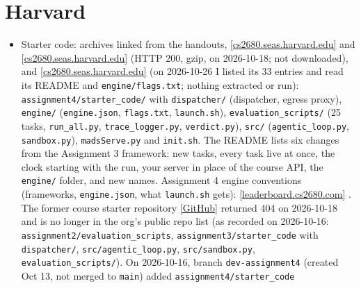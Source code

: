 \documentclass[10pt,oneside]{report}
\begin{document}
\section{Harvard}
{\small\begin{itemize}
\item Starter code: archives linked from the handouts, \href{https://cs2680.seas.harvard.edu/assignments/assignment2.tar.gz}{[cs2680.seas.harvard.edu]} and \href{https://cs2680.seas.harvard.edu/assignments/assignment3.tar.gz}{[cs2680.seas.harvard.edu]} (HTTP 200, gzip, on 2026-10-18; not downloaded), and \href{https://cs2680.seas.harvard.edu/assignments/assignment4.tar.gz}{[cs2680.seas.harvard.edu]} (on 2026-10-26 I listed its 33 entries and read its README and \texttt{engine/\allowbreak{}flags.\allowbreak{}txt}; nothing extracted or run): \texttt{assignment4/\allowbreak{}starter\_\allowbreak{}code/\allowbreak{}} with \texttt{dispatcher/\allowbreak{}} (dispatcher, egress proxy), \texttt{engine/\allowbreak{}} (\texttt{engine.\allowbreak{}json}, \texttt{flags.\allowbreak{}txt}, \texttt{launch.\allowbreak{}sh}), \texttt{evaluation\_\allowbreak{}scripts/\allowbreak{}} (25 tasks, \texttt{run\_\allowbreak{}all.\allowbreak{}py}, \texttt{trace\_\allowbreak{}logger.\allowbreak{}py}, \texttt{verdict.\allowbreak{}py}), \texttt{src/\allowbreak{}} (\texttt{agentic\_\allowbreak{}loop.\allowbreak{}py}, \texttt{sandbox.\allowbreak{}py}), \texttt{madsServe.\allowbreak{}py} and \texttt{init.\allowbreak{}sh}. The README lists six changes from the Assignment 3 framework: new tasks, every task live at once, the clock starting with the run, your server in place of the course API, the \texttt{engine/\allowbreak{}} folder, and new names. Assignment 4 engine conventions (frameworks, \texttt{engine.\allowbreak{}json}, what \texttt{launch.\allowbreak{}sh} gets): \href{https://leaderboard.cs2680.com/a4/engines.html}{[leaderboard.cs2680.com]} . The former course starter repository \href{https://github.com/HarvardMadSys/cs2680_assignments}{[GitHub]} returned 404 on 2026-10-18 and is no longer in the org's public repo list (as recorded on 2026-10-16: \texttt{assignment2/\allowbreak{}evaluation\_\allowbreak{}scripts}, \texttt{assignment3/\allowbreak{}starter\_\allowbreak{}code} with \texttt{dispatcher/\allowbreak{}}, \texttt{src/\allowbreak{}agentic\_\allowbreak{}loop.\allowbreak{}py}, \texttt{src/\allowbreak{}sandbox.\allowbreak{}py}, \texttt{evaluation\_\allowbreak{}scripts/\allowbreak{}}). On 2026-10-16, branch \texttt{dev-assignment4} (created Oct 13, not merged to \texttt{main}) added \texttt{assignment4/\allowbreak{}starter\_\allowbreak{}code}

\end{itemize}}
\end{document}
